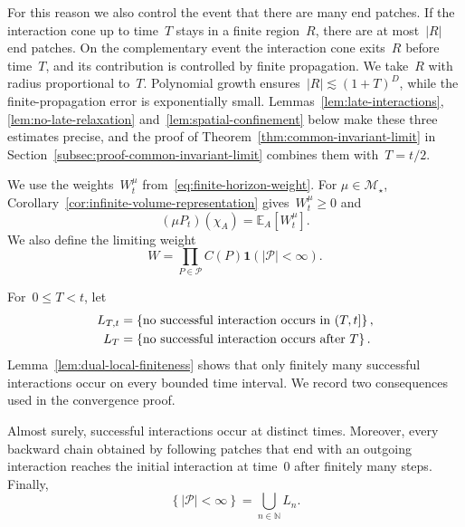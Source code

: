 \documentclass[EJP,preprint,NODS,nobera]{ejpecp}
\newcommand{\N}{\mathbb{N}}
\newcommand{\E}{\mathbb{E}}
\newcommand{\bb}[1]{\left(#1\right)}
\newcommand{\Cb}[1]{\left[#1\right]}
\newcommand{\cb}[1]{\left\{#1\right\}}
\newcommand{\abs}[1]{\left|#1\right|}
\newcommand{\ind}{\mathbf{1}}
\newcommand{\chg}[1]{{\color{changegreen}#1}}
\begin{document}
For this reason we also control the event that there are many end patches. If
the interaction cone up to time~$T$ stays in a finite region~$R$, there are at
most~$\abs R$ end patches. On the complementary event the interaction cone
exits~$R$ before time~$T$, and its contribution is controlled by finite
propagation. We take~$R$ with radius proportional to~$T$. Polynomial growth
ensures~$\abs R\lesssim(1+T)^D$, while the finite-propagation error is
exponentially small. Lemmas~\ref{lem:late-interactions},
\ref{lem:no-late-relaxation} and~\ref{lem:spatial-confinement} below make
these three estimates precise, and the proof of
Theorem~\ref{thm:common-invariant-limit} in
Section~\ref{subsec:proof-common-invariant-limit} combines them with~$T=t/2$. 

\chg{We use the weights~$W_t^\mu$ from~\eqref{eq:finite-horizon-weight}. For
$\mu\in\mathcal M_\star$, Corollary~\ref{cor:infinite-volume-representation}
gives~$W_t^\mu\geq0$ and}
\begin{equation*}
(\mu P_t)(\chi_A)=\E_A\Cb{W_t^\mu}.
\end{equation*}
We also define the limiting weight
\begin{equation}
\label{eq:limiting-patch-weight}
W
=
\prod_{P\in\mathcal P}C(P)
\ind\bb{\abs{\mathcal P}<\infty}.
\end{equation}

For~$0\leq T<t$, let
\begin{align}
\label{eq:no-late-interaction-events}
L_{T,t}
&=
\cb{\text{no successful interaction occurs in }(T,t]},
\notag\\
L_T
&=
\cb{\text{no successful interaction occurs after }T}.
\end{align}
Lemma~\ref{lem:dual-local-finiteness} shows that only finitely many
successful interactions occur on every bounded time interval. We record two
consequences used in the convergence proof.

\begin{lemma}
\label{lem:patch-local-finiteness-consequences}
Almost surely, successful interactions occur at distinct times. Moreover, every
backward chain obtained by following patches that end with an outgoing
interaction reaches the initial interaction at time~$0$ after finitely many
steps. Finally,
\begin{equation}
\label{eq:finite-patch-family-last-interaction}
\cb{\abs{\mathcal P}<\infty}
=
\bigcup_{n\in\N}L_n.
\end{equation}
\end{lemma}
\end{document}
